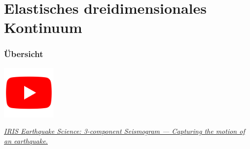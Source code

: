 \documentclass[hyperref={pdfpagemode=FullScreen, colorlinks=false}]{beamer}
\begin{document}
\maketitle

\section{Elastisches dreidimensionales Kontinuum}

\begin{frame}
\frametitle{Übersicht}
\begin{center}
\includegraphics[width=0.2\textwidth]{fig_img/youtube.png}   
\end{center}

\href{https://www.youtube.com/watch?v=Za_22xo7ZQQ}{\textsl{IRIS Earthquake Science: 3-component Seismogram --- Capturing the motion of an earthquake.}}

\end{frame}
\end{document}
